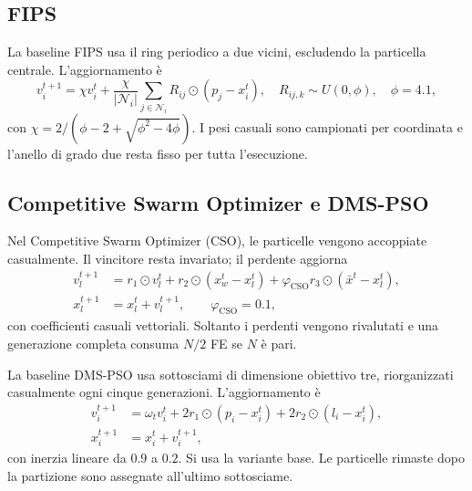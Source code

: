 \subsection{FIPS}

La baseline FIPS usa il ring periodico a due vicini, escludendo la particella centrale. L'aggiornamento è
\begin{equation}
 v_i^{t+1}=\chi v_i^t+\frac{\chi}{|\mathcal N_i|}
 \sum_{j\in\mathcal N_i}R_{ij}\odot(p_j-x_i^t),
 \quad R_{ij,k}\sim U(0,\phi),\quad \phi=4.1,
 \label{eq:app-fips}
\end{equation}
con $\chi=2/(\phi-2+\sqrt{\phi^2-4\phi})$. I pesi casuali sono campionati per coordinata e l'anello di grado due resta fisso per tutta l'esecuzione.

\subsection{Competitive Swarm Optimizer e DMS-PSO}

Nel Competitive Swarm Optimizer (CSO), le particelle vengono accoppiate casualmente. Il vincitore resta invariato; il perdente aggiorna
\begin{equation}
\begin{aligned}
 v_l^{t+1}&=r_1\odot v_l^t+r_2\odot(x_w^t-x_l^t)
 +\varphi_{\mathrm{CSO}}r_3\odot(\bar x^t-x_l^t),\\
 x_l^{t+1}&=x_l^t+v_l^{t+1},\qquad \varphi_{\mathrm{CSO}}=0.1,
\end{aligned}
\label{eq:app-cso}
\end{equation}
con coefficienti casuali vettoriali. Soltanto i perdenti vengono rivalutati e una generazione completa consuma $N/2$ FE se $N$ è pari.

La baseline DMS-PSO usa sottosciami di dimensione obiettivo tre, riorganizzati casualmente ogni cinque generazioni. L'aggiornamento è
\begin{equation}
\begin{aligned}
 v_i^{t+1}&=\omega_t v_i^t+2r_1\odot(p_i-x_i^t)
 +2r_2\odot(l_i-x_i^t),\\
 x_i^{t+1}&=x_i^t+v_i^{t+1},
\end{aligned}
\label{eq:app-dms}
\end{equation}
con inerzia lineare da $0.9$ a $0.2$. Si usa la variante base. Le particelle rimaste dopo la partizione sono assegnate all'ultimo sottosciame.

